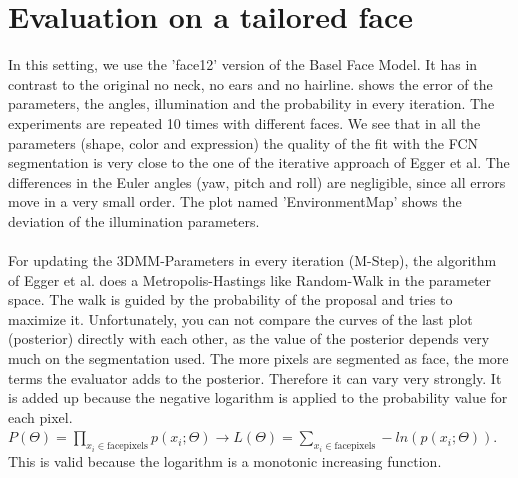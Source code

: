 \section{Evaluation on a tailored face}
In this setting, we use the 'face12' version of the Basel Face Model. It has in contrast to the original no neck, no ears and no hairline.  shows the error of the parameters, the angles, illumination and the probability in every iteration. The experiments are repeated 10 times with different faces. We see that in all the parameters (shape, color and expression) the quality of the fit with the FCN segmentation is very close to the one of the iterative approach of Egger et al. The differences in the Euler angles (yaw, pitch and roll) are negligible, since all errors move in a very small order. The plot named 'EnvironmentMap' shows the deviation of the illumination parameters.\\
\\
For updating the 3DMM-Parameters in every iteration (M-Step), the algorithm of Egger et al. does a Metropolis-Hastings like Random-Walk in the parameter space. The walk is guided by the probability of the proposal and tries to maximize it. Unfortunately, you can not compare the curves of the last plot (posterior) directly with each other, as the value of the posterior depends very much on the segmentation used. The more pixels are segmented as face, the more terms the evaluator adds to the posterior. Therefore it can vary very strongly. It is added up because the negative logarithm is applied to the probability value for each pixel. $P(\Theta)=\prod_{x_i \in \text{facepixels}}p(x_i ; \Theta) \rightarrow L(\Theta)=\sum_{x_i \in \text{facepixels}}-ln(p(x_i ; \Theta))$. This is valid because the logarithm is a monotonic increasing function.

